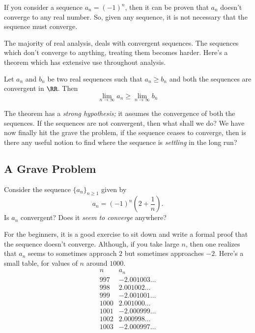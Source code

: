 \documentclass[parskip=half, numbers=endperiod, 11pt]{scrartcl}
\begin{document}
If you consider a sequence $a_n = (-1)^n$, then it can
be proven that $a_n$ doesn't converge to any real number.
So, given any sequence, it is not necessary that the
sequence must converge.

The majority of real analysis, deals with convergent
sequences. The sequences which don't converge to anything,
treating them becomes harder. Here's a theorem which
has extensive use throughout analysis.

\begin{theorem}\label{thm:lim_ineq}
	Let $a_n$ and $b_n$ be two real sequences such that
	$a_n \ge b_n$ and both the sequences are
	convergent in $\RR$. Then
	\[ \lim_{n \to \infty} a_n \ge \lim_{n \to \infty} b_n \]
\end{theorem}

The theorem has a \emph{strong hypothesis;} it assumes
the convergence of both the sequences. If the sequences
are not convergent, then what shall we do? We have
now finally hit the grave the problem, if the sequence ceases
to converge, then is there any useful notion to find where
the sequence is \emph{settling} in the long run?

\subsection{A Grave Problem}
\begin{example}\label{example:multiple_accumulation_points}
	Consider the sequence $\{a_n\}_{n \ge 1}$ given by
	\[a_n = (-1)^{n}\left( 2 + \frac 1 n \right).  \]
	Is $a_n$ convergent? Does it \emph{seem to converge}
	anywhere?
\end{example}

For the beginners, it is a good exercise to sit down and
write a formal proof that the sequence doesn't converge.
Although, if you take large $n$, then one realizes
that $a_n$ seems to sometimes approach $2$ but sometimes
approaches $-2$. Here's a small table, for values of $n$
around $1000$.
\[
	\begin{array}{c|c}
		n    & a_n             \\ \hline
		997  & -2.001003\ldots \\
		998  & 2.001002\ldots  \\
		999  & -2.001001\ldots \\
		1000 & 2.001000\ldots  \\
		1001 & -2.000999\ldots \\
		1002 & 2.000998\ldots  \\
		1003 & -2.000997\ldots
	\end{array}
\]
\end{document}
